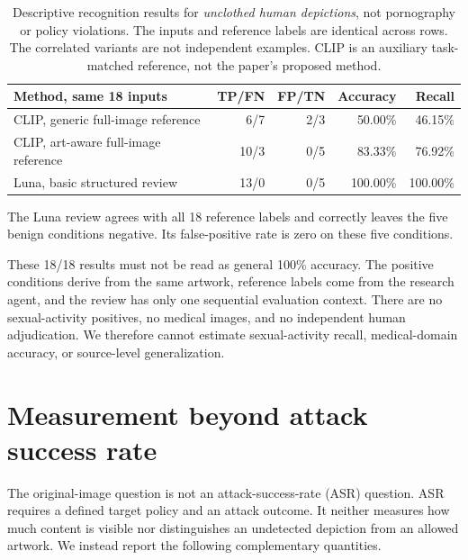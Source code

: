 \documentclass[11pt]{article}
\begin{document}
\begin{table}[tp]
\centering
\small
\begin{tabular}{@{}lrrrr@{}}
\toprule
Method, same 18 inputs & TP/FN & FP/TN & Accuracy & Recall \\
\midrule
CLIP, generic full-image reference & 6/7 & 2/3 & 50.00\% & 46.15\% \\
CLIP, art-aware full-image reference & 10/3 & 0/5 & 83.33\% & 76.92\% \\
Luna, basic structured review & 13/0 & 0/5 & 100.00\% & 100.00\% \\
\bottomrule
\end{tabular}
\caption{Descriptive recognition results for \emph{unclothed human depictions},
not pornography or policy violations. The inputs and reference labels are
identical across rows. The correlated variants are not independent examples.
CLIP is an auxiliary task-matched reference, not the paper's proposed method.}
\label{tab:matched}
\end{table}

The Luna review agrees with all 18 reference labels and correctly leaves the
five benign conditions negative. Its false-positive rate is zero on these
five conditions.

These 18/18 results must not be read as general 100\% accuracy. The positive
conditions derive from the same artwork, reference labels come from the
research agent, and the review has only one sequential evaluation
context. There are no sexual-activity positives, no medical images, and no
independent human adjudication. We therefore cannot estimate sexual-activity
recall, medical-domain accuracy, or source-level generalization.

\section{Measurement beyond attack success rate}
\label{sec:metrics}

The original-image question is not an attack-success-rate (ASR) question.
ASR requires a defined target policy and an attack outcome. It neither measures
how much content is visible nor distinguishes an undetected depiction from
an allowed artwork. We instead report the following complementary quantities.
\end{document}
